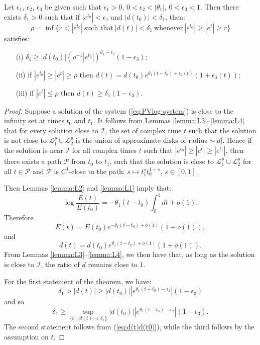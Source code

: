 \begin{theorem}\label{th:estimates}
Let $\epsilon_1$, $\epsilon_2$, $\epsilon_3$ be given such that $\epsilon_1>0$, $0<\epsilon_2<|\theta_1|$, $0<\epsilon_3<1$.
Then there exists $\delta_1>0$ such that if $|e^{t_0}|<\epsilon_1$ and $|d(t_0)|<\delta_1$, then:
$$
\rho=\inf\{ r<|e^{t_0}| \ \text{such that}\ |d(t)|<\delta_1\ \text{whenever}\ |e^{t_0}|\ge|e^{t}|\ge r\}
$$
satisfies:
\begin{itemize}
\item[(i)]
$\delta_1\ge|d(t_0)|\left(\rho^{-1}|e^{t_0}|\right)^{\theta_1-\epsilon_2}(1-\epsilon_3)$;
\item[(ii)]
if $|e^{t_0}|\ge|e^{t}|\ge\rho$ then $d(t)=d(t_0)e^{\theta_1(t-t_0)+\epsilon_2(t)}(1+\epsilon_3(t))$;
\item[(iii)]
if $|e^{t}|\le\rho$ then $d(t)\ge\delta_1(1-\epsilon_3)$.
\end{itemize}
\end{theorem}

\begin{proof}
Suppose a solution of the system (\ref{eq:PVlog-system}) is close to the infinity set at times $t_0$ and $t_1$.
It follows from Lemmas \ref{lemma:L3}--\ref{lemma:L4} that for every solution close to $\mathcal{I}$, the set of complex time $t$ such that the solution is not close to $\mathcal{L}_{1}^p\cup\mathcal{L}_{2}^p$ is the union of approximate disks of radius $\sim|d|$.
Hence if the solution is near $\mathcal{I}$ for all complex times $t$ such that $|e^{t_0}|\ge|e^{t}|\ge|e^{t_1}|$, then there exists a path $\mathcal{P}$ from $t_0$ to $t_1$, such that the solution is close to $\mathcal{L}_{1}^p\cup\mathcal{L}_{2}^p$ for all $t\in\mathcal{P}$ and $\mathcal{P}$ is $C^1$-close to the path: $s\mapsto t_1^s t_0^{1-s}$, $s\in[0,1]$.

Then Lemmas \ref{lemma:L2} and \ref{lemma:L1} imply that:
$$
\log\frac{E(t)}{E(t_0)}=-\theta_1(t-t_0)\int_0^1dt+o(1).
$$
Therefore
$$
E(t)=E(t_0)e^{-\theta_1(t-t_0)+o(1)}(1+o(1)),
$$
and
\begin{equation}\label{eq:d(t)d(t0)}
d(t)=d(t_0)e^{\theta_1(t-t_0)+o(1)}(1+o(1)).
\end{equation}
From Lemmas \ref{lemma:L3}--\ref{lemma:L4}, we then have that, as long as the solution is close to $\mathcal{I}$, the ratio of $d$ remains close to $1$.

For the first statement of the theorem, we have:
$$
\delta_1>|d(t)|\ge |d(t_0)| \left| e^{\theta_1(t-t_0)-\epsilon_2}\right|(1-\epsilon_3)
$$
and so
$$
\delta_1\ge\sup_{\{t\mid |d(t)|<\delta_1\}}  |d(t_0)| \left| e^{\theta_1(t-t_0)-\epsilon_2}\right|(1-\epsilon_3).
$$
The second statement follows from (\ref{eq:d(t)d(t0)}), while the third follows by the assumption on $t$.
\end{proof}

